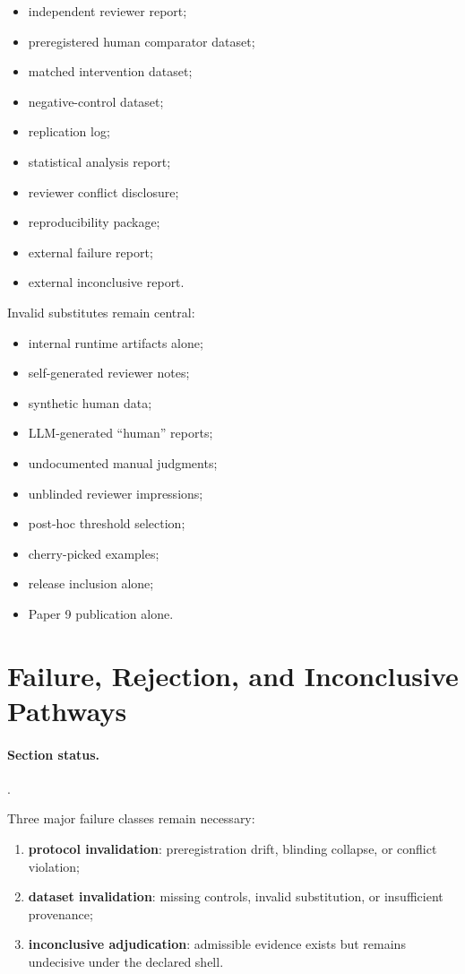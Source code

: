 \documentclass[11pt]{article}
\newcommand{\sectionstatus}[1]{\paragraph{Section status.}\texttt{\detokenize{#1}}.}
\begin{document}
\begin{itemize}
\item independent reviewer report;
\item preregistered human comparator dataset;
\item matched intervention dataset;
\item negative-control dataset;
\item replication log;
\item statistical analysis report;
\item reviewer conflict disclosure;
\item reproducibility package;
\item external failure report;
\item external inconclusive report.
\end{itemize}

Invalid substitutes remain central:

\begin{itemize}
\item internal runtime artifacts alone;
\item self-generated reviewer notes;
\item synthetic human data;
\item LLM-generated ``human'' reports;
\item undocumented manual judgments;
\item unblinded reviewer impressions;
\item post-hoc threshold selection;
\item cherry-picked examples;
\item release inclusion alone;
\item Paper 9 publication alone.
\end{itemize}

\section{Failure, Rejection, and Inconclusive Pathways}
\sectionstatus{protocol_defined}

Three major failure classes remain necessary:

\begin{enumerate}
\item \textbf{protocol invalidation}: preregistration drift, blinding collapse, or conflict violation;
\item \textbf{dataset invalidation}: missing controls, invalid substitution, or insufficient provenance;
\item \textbf{inconclusive adjudication}: admissible evidence exists but remains undecisive under the declared shell.
\end{enumerate}
\end{document}
